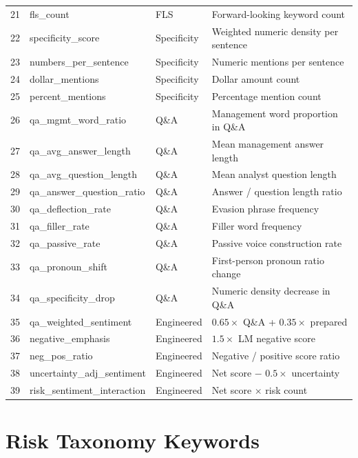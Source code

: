 \documentclass[12pt,a4paper]{article}
\begin{document}
\begin{longtable}{@{}rllp{6.5cm}@{}}
21 & fls\_count & FLS & Forward-looking keyword count \\
22 & specificity\_score & Specificity & Weighted numeric density per sentence \\
23 & numbers\_per\_sentence & Specificity & Numeric mentions per sentence \\
24 & dollar\_mentions & Specificity & Dollar amount count \\
25 & percent\_mentions & Specificity & Percentage mention count \\
26 & qa\_mgmt\_word\_ratio & Q\&A & Management word proportion in Q\&A \\
27 & qa\_avg\_answer\_length & Q\&A & Mean management answer length \\
28 & qa\_avg\_question\_length & Q\&A & Mean analyst question length \\
29 & qa\_answer\_question\_ratio & Q\&A & Answer / question length ratio \\
30 & qa\_deflection\_rate & Q\&A & Evasion phrase frequency \\
31 & qa\_filler\_rate & Q\&A & Filler word frequency \\
32 & qa\_passive\_rate & Q\&A & Passive voice construction rate \\
33 & qa\_pronoun\_shift & Q\&A & First-person pronoun ratio change \\
34 & qa\_specificity\_drop & Q\&A & Numeric density decrease in Q\&A \\
35 & qa\_weighted\_sentiment & Engineered & $0.65 \times$ Q\&A + $0.35 \times$ prepared \\
36 & negative\_emphasis & Engineered & $1.5 \times$ LM negative score \\
37 & neg\_pos\_ratio & Engineered & Negative / positive score ratio \\
38 & uncertainty\_adj\_sentiment & Engineered & Net score $-$ $0.5 \times$ uncertainty \\
39 & risk\_sentiment\_interaction & Engineered & Net score $\times$ risk count \\
\bottomrule
\end{longtable}

\section{Risk Taxonomy Keywords}
\label{app:risk-keywords}
\end{document}
